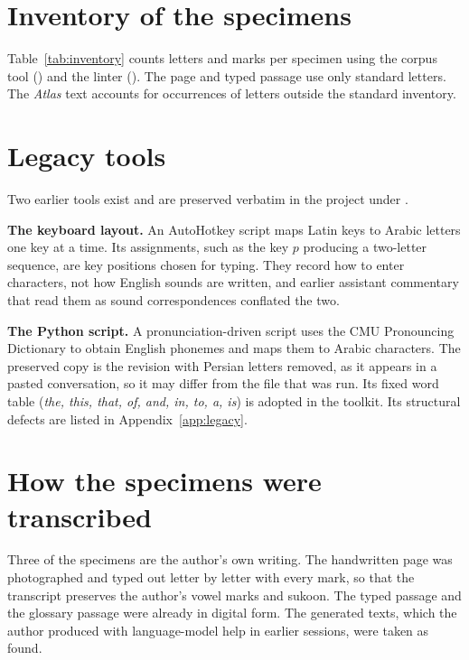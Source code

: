 \section{Inventory of the specimens}
Table~\ref{tab:inventory} counts letters and marks per specimen using the corpus tool () and the linter (). The page and typed passage use only standard letters. The \emph{Atlas} text accounts for \AtlasExtended{} occurrences of letters outside the standard inventory.

\begin{table}[ht]\centering\small

\caption{Letter, mark and inventory statistics for each specimen. Extended letters are letters outside the standard Arabic block, with their counts.}\label{tab:inventory}
\end{table}

\section{Legacy tools}
Two earlier tools exist and are preserved verbatim in the project under .

\textbf{The keyboard layout.} An AutoHotkey script maps Latin keys to Arabic letters one key at a time. Its assignments, such as the key $p$ producing a two-letter sequence, are key positions chosen for typing. They record how to enter characters, not how English sounds are written, and earlier assistant commentary that read them as sound correspondences conflated the two.

\textbf{The Python script.} A pronunciation-driven script uses the CMU Pronouncing Dictionary to obtain English phonemes and maps them to Arabic characters. The preserved copy is the revision with Persian letters removed, as it appears in a pasted conversation, so it may differ from the file that was run. Its fixed word table (\emph{the, this, that, of, and, in, to, a, is}) is adopted in the toolkit. Its structural defects are listed in Appendix~\ref{app:legacy}.

\section{How the specimens were transcribed}
Three of the specimens are the author's own writing. The handwritten page was photographed and typed out letter by letter with every mark, so that the transcript preserves the author's vowel marks and sukoon. The typed passage and the glossary passage were already in digital form. The generated texts, which the author produced with language-model help in earlier sessions, were taken as found.

